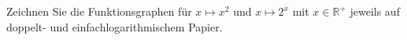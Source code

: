 \item
Zeichnen Sie die Funktionsgraphen für  $x \mapsto x^2$ und $x \mapsto 2^x$ mit $x \in \mathbb{R}^+$ jeweils auf doppelt- und einfachlogarithmischem Papier.
